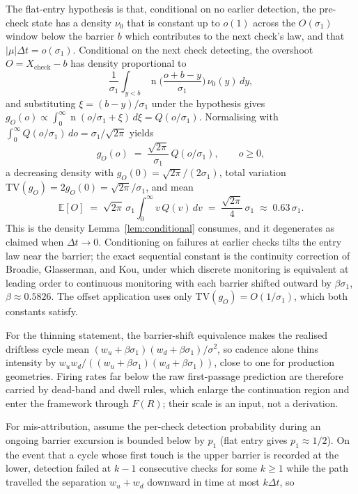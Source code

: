 \documentclass[11pt,a4paper]{article}
\theoremstyle{definition}
\theoremstyle{plain}
\theoremstyle{remark}
\newcommand{\surv}{Q}
\DeclareMathOperator{\nden}{n}
\begin{document}
The flat-entry hypothesis is that, conditional on no earlier detection, the pre-check state has a density $\nu_0$ that is constant up to $o(1)$ across the $O(\sigma_1)$ window 
below the barrier $b$ which contributes to the next check's law, and that $|\mu| \Delta t = o(\sigma_1)$. Conditional on the next check detecting, the overshoot $O = X_{\text{check}} - b$ 
has density proportional to
\[
\frac{1}{\sigma_1}\int_{y < b}
\nden\Big(\frac{o + b - y}{\sigma_1}\Big)\, \nu_0(y)\, dy,
\]
and substituting $\xi = (b-y)/\sigma_1$ under the
hypothesis gives $g_O(o) \propto \int_0^\infty \nden(o/\sigma_1
+ \xi)\, d\xi = \surv(o/\sigma_1)$. Normalising with $\int_0^\infty
\surv(o/\sigma_1)\, do = \sigma_1/\sqrt{2\pi}$ yields
\[
g_O(o) \;=\; \frac{\sqrt{2\pi}}{\sigma_1}\, \surv(o/\sigma_1),
\qquad o \ge 0,
\]
a decreasing density with $g_O(0) = \sqrt{2\pi}/(2\sigma_1)$, total
variation $\mathrm{TV}(g_O) = 2 g_O(0) = \sqrt{2\pi}/\sigma_1$, and
mean
\[
\mathbb{E}[O] \;=\; \sqrt{2\pi}\, \sigma_1 \int_0^\infty v\,
\surv(v)\, dv \;=\; \frac{\sqrt{2\pi}}{4}\, \sigma_1
\;\approx\; 0.63\, \sigma_1.
\]
This is the density Lemma~\ref{lem:conditional} consumes, and it degenerates as claimed when $\Delta t \to 0$. Conditioning on failures at earlier checks tilts the entry law 
near the barrier; the exact sequential constant is the continuity correction of Broadie, Glasserman, and Kou,\cite{bgk1997} under which discrete monitoring is equivalent at 
leading order to continuous monitoring with each barrier shifted outward by $\beta \sigma_1$, $\beta \approx 0.5826$. The offset application uses only $\mathrm{TV}(g_O) = O(1/\sigma_1)$, 
which both constants satisfy.

For the thinning statement, the barrier-shift equivalence makes the realised driftless cycle mean $(w_u + \beta \sigma_1)(w_d + \beta \sigma_1)/\sigma^2$, so cadence alone
thins intensity by $w_u w_d / ((w_u + \beta \sigma_1)(w_d + \beta \sigma_1))$, close to one for production geometries. Firing rates far below the raw first-passage prediction are 
therefore carried by dead-band and dwell rules, which enlarge the continuation region and enter the framework through $F(R)$; their scale is an input, not a derivation.

For mis-attribution, assume the per-check detection probability during an ongoing barrier excursion is bounded below by $p_1$ (flat entry gives $p_1 \approx 1/2$). On the event 
that a cycle whose first touch is the upper barrier is recorded at the lower, detection failed at $k - 1$ consecutive checks for some $k \ge 1$ while the path travelled the 
separation $w_u + w_d$ downward in time at most $k \Delta t$, so
\end{document}
